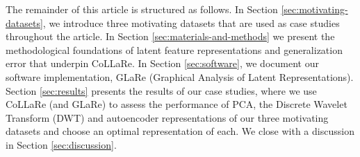 The remainder of this article is structured as follows.
In Section \ref{sec:motivating-datasets}, we introduce three motivating datasets that are used as case studies throughout the article. 
In Section \ref{sec:materials-and-methods}  we present the methodological foundations of latent feature representations and generalization error that underpin CoLLaRe. 
In Section \ref{sec:software}, we document our software implementation, GLaRe (Graphical Analysis of Latent Representations).
Section \ref{sec:results} presents the results of our case studies, where we use CoLLaRe (and GLaRe) to assess the performance of PCA, the Discrete Wavelet Transform (DWT) and autoencoder representations of our three motivating datasets and choose an optimal representation of each.
We close with a discussion in Section \ref{sec:discussion}.





